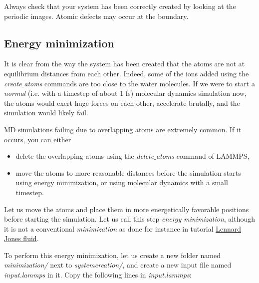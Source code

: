 \vspace{0.25cm} \noindent Always check that your system has been correctly created
by looking at the periodic images. Atomic defects may
occur at the boundary.

\subsection{Energy minimization}
\noindent \begin{tcolorbox}[colback=mylightblue!5!white,colframe=mylightblue!75!black,title=Why is energy minimization necessary?]

\vspace{0.25cm} \noindent It is clear from the way the system has been created that
the atoms are not at equilibrium distances from each
other. Indeed, some of the ions added using the \textit{create$\_$atoms}
commands are too close to the water molecules.
If we were to start a \textit{normal} (i.e. with a timestep of about 1 fs)
molecular dynamics simulation now, the atoms
would exert huge forces on each other, accelerate
brutally, and the simulation would likely fail.
\end{tcolorbox}

\noindent \begin{tcolorbox}[colback=mylightblue!5!white,colframe=mylightblue!75!black,title=Dealing with overlapping atoms]

\vspace{0.25cm} \noindent MD simulations failing due to overlapping atoms are
extremely common. If it occurs, you can either

\begin{itemize}
\item delete the overlapping atoms using the \textit{delete$\_$atoms} command of LAMMPS,
\item move the atoms to more reasonable distances before the simulation starts using energy minimization, or using molecular dynamics with a small timestep.
\end{itemize}
\end{tcolorbox}

\noindent Let us move the atoms and place them
in more energetically favorable positions before starting the simulation.
Let us call this step \textit{energy minimization}, although it is not 
a conventional \textit{minimization} as done for instance
in tutorial \hyperref[lennard-jones-label]{Lennard Jones fluid}.

\vspace{0.25cm} \noindent To perform this energy minimization, let us
create a new folder named \textit{minimization/} next to \textit{systemcreation/},
and create a new input file named \textit{input.lammps} in it. Copy the following lines
in \textit{input.lammps}:

